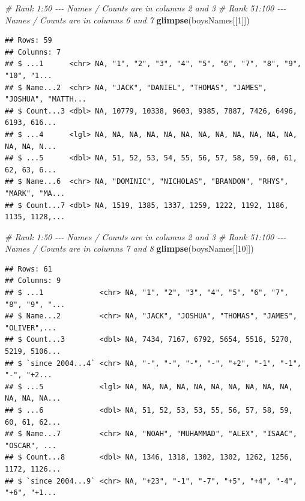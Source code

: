\documentclass[
]{book}
\newenvironment{Shaded}{\begin{snugshade}}{\end{snugshade}}
\newcommand{\CommentTok}[1]{\textcolor[rgb]{0.56,0.35,0.01}{\textit{#1}}}
\newcommand{\DecValTok}[1]{\textcolor[rgb]{0.00,0.00,0.81}{#1}}
\newcommand{\KeywordTok}[1]{\textcolor[rgb]{0.13,0.29,0.53}{\textbf{#1}}}
\newcommand{\NormalTok}[1]{#1}
\begin{document}
\begin{Shaded}
\begin{Highlighting}[]
\CommentTok{\# Rank 1:50 {-}{-}{-} Names / Counts are in columns 2 and 3 }
\CommentTok{\# Rank 51:100 {-}{-}{-} Names / Counts are in columns 6 and 7}
\KeywordTok{glimpse}\NormalTok{(boysNames[[}\DecValTok{1}\NormalTok{]]) }
\end{Highlighting}
\end{Shaded}

\begin{verbatim}
## Rows: 59
## Columns: 7
## $ ...1      <chr> NA, "1", "2", "3", "4", "5", "6", "7", "8", "9", "10", "1...
## $ Name...2  <chr> NA, "JACK", "DANIEL", "THOMAS", "JAMES", "JOSHUA", "MATTH...
## $ Count...3 <dbl> NA, 10779, 10338, 9603, 9385, 7887, 7426, 6496, 6193, 616...
## $ ...4      <lgl> NA, NA, NA, NA, NA, NA, NA, NA, NA, NA, NA, NA, NA, NA, N...
## $ ...5      <dbl> NA, 51, 52, 53, 54, 55, 56, 57, 58, 59, 60, 61, 62, 63, 6...
## $ Name...6  <chr> NA, "DOMINIC", "NICHOLAS", "BRANDON", "RHYS", "MARK", "MA...
## $ Count...7 <dbl> NA, 1519, 1385, 1337, 1259, 1222, 1192, 1186, 1135, 1128,...
\end{verbatim}

\begin{Shaded}
\begin{Highlighting}[]
\CommentTok{\# Rank 1:50 {-}{-}{-} Names / Counts are in columns 2 and 3 }
\CommentTok{\# Rank 51:100 {-}{-}{-} Names / Counts are in columns 7 and 8}
\KeywordTok{glimpse}\NormalTok{(boysNames[[}\DecValTok{10}\NormalTok{]]) }
\end{Highlighting}
\end{Shaded}

\begin{verbatim}
## Rows: 61
## Columns: 9
## $ ...1             <chr> NA, "1", "2", "3", "4", "5", "6", "7", "8", "9", "...
## $ Name...2         <chr> NA, "JACK", "JOSHUA", "THOMAS", "JAMES", "OLIVER",...
## $ Count...3        <dbl> NA, 7434, 7167, 6792, 5654, 5516, 5270, 5219, 5106...
## $ `since 2004...4` <chr> NA, "-", "-", "-", "-", "+2", "-1", "-1", "-", "+2...
## $ ...5             <lgl> NA, NA, NA, NA, NA, NA, NA, NA, NA, NA, NA, NA, NA...
## $ ...6             <dbl> NA, 51, 52, 53, 53, 55, 56, 57, 58, 59, 60, 61, 62...
## $ Name...7         <chr> NA, "NOAH", "MUHAMMAD", "ALEX", "ISAAC", "OSCAR", ...
## $ Count...8        <dbl> NA, 1346, 1318, 1302, 1302, 1262, 1256, 1172, 1126...
## $ `since 2004...9` <chr> NA, "+23", "-1", "-7", "+5", "+4", "-4", "+6", "+1...
\end{verbatim}
\end{document}
